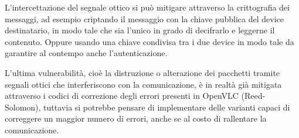 L'intercettazione del segnale ottico si può mitigare attraverso la crittografia dei messaggi, ad esempio criptando il messaggio con la chiave pubblica del device destinatario, in modo tale che sia l'unico in grado di decifrarlo e leggerne il contenuto. Oppure usando una chiave condivisa tra i due device in modo tale da garantire al contempo anche l'autenticazione.

L'ultima vulnerabilità, cioè la distruzione o alterazione dei pacchetti tramite segnali ottici che interferiscono con la comunicazione, è in realtà già mitigata attraverso i codici di correzione degli errori presenti in OpenVLC (Reed-Solomon), tuttavia si potrebbe pensare di implementare delle varianti capaci di correggere un maggior numero di errori, anche se al costo di rallentare la comunicazione.
